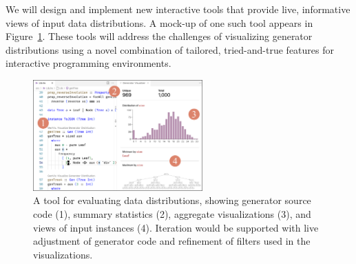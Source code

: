 We will design and implement new interactive tools that provide live,
informative views of input data distributions. A mock-up of one such tool appears
in Figure~\ref{fig:gen-vis}. These tools will address the
challenges of visualizing generator distributions using a novel combination of
tailored, tried-and-true features for interactive programming
environments.

\begin{figure}
  \centering
  \includegraphics[width=0.58\textwidth]{assets/gen-vis.pdf}
  \caption{A tool for evaluating data distributions, showing
  generator source code (1), summary statistics (2),
  aggregate visualizations (3), and views of input instances
  (4). Iteration would be supported with live adjustment of
  generator code and refinement of filters used in the
  visualizations.}\label{fig:gen-vis}
\end{figure}

